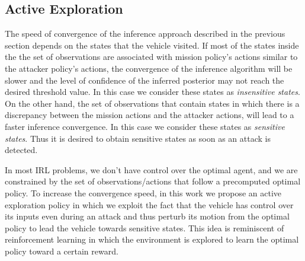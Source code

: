 \documentclass[letterpaper, 10 pt, conference]{ieeeconf}  %
\begin{document}
\subsection{Active Exploration}
The speed of convergence of the inference approach described in the previous section depends on the states that the vehicle visited. If most of the states inside the the set of observations are associated with mission policy's actions similar to the attacker policy's actions, the convergence of the inference algorithm will be slower and the level of confidence of the inferred posterior may not reach the desired threshold value. In this case we consider these states as {\em insensitive states}. On the other hand, the set of observations that contain states in which there is a discrepancy between the mission actions and the attacker actions, will lead to a faster inference convergence. In this case we consider these states as {\em sensitive states}. Thus it is desired to obtain sensitive states as soon as an attack is detected.


In most IRL problems, we don't have control over the optimal agent, and we are constrained by the set of observations/actions that follow a precomputed optimal policy. To increase the convergence speed, in this work we propose an active exploration policy in which we exploit the fact that the vehicle has control over its inputs even during an attack and thus perturb its motion from the optimal policy to lead the vehicle towards sensitive states. This idea is reminiscent of reinforcement learning in which the environment is explored to learn the optimal policy toward a certain reward.


\end{document}
